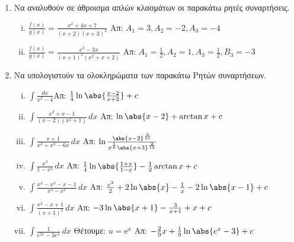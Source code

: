 





\begin{center}
  \minibox{\bfseries\large \textcolor{Col1}{Ολοκληρώματα Ρητών και Άρρητων Συναρτήσεων}}
\end{center}

\vspace{2\baselineskip}

\everymath{\displaystyle}

\pagestyle{empty}

\begin{enumerate}
  \item Να αναλυθούν σε άθροισμα απλών κλασμάτων οι παρακάτω ρητές συναρτήσεις.

    \begin{enumerate}[i)]
      \item $\frac{f(x)}{g(x)}=\frac{x^2+4x+7}{(x+2)(x+3)^2}$ 
        \hfill Απ: $A_1=3, A_2=-2, A_3=-4$
      \item $\frac{f(x)}{g(x)}=\frac{x^3-3x}{(x+1)^2(x^2+x+2)}$ 
        \hfill Απ: $A_1=\frac{1}{2}, A_2=1, A_3=\frac{1}{2}, B_3=-3$
    \end{enumerate}

  \item Να υπολογιστούν τα ολοκληρώματα των παρακάτω Ρητών συναρτήσεων.
    \begin{enumerate}[i)]
      \item $\int\frac{dx}{x^2-4}$\hfill Απ: $\frac{1}{4}\ln\abs{\frac{x-2}{x+2}}+c$
      \item $\int\frac{x^2+x-1}{(x-2)(x^2+1)}\,dx$ \hfill Απ: $\ln\abs{x-2}+\arctan x+c$
      \item $\int\frac{x+1}{x^3+x^2-6x}\,dx$ 
        \hfill Απ: $\ln\frac{\abs{x-2}^{\frac{3}{10}}}{x^{\frac{1}{6}}
        \abs{x+3}^{\frac{2}{15}}}$
      \item $\int\frac{x^2}{1-x^4}\,dx$ 
        \hfill Απ: $\frac{1}{4}\ln\abs{\frac{1+x}{1-x}}-\frac{1}{2}\arctan x+c$
      \item $\int\frac{x^4-x^3-x-1}{x^3-x^2}\,dx$ 
        \hfill Απ: $\frac{x^2}{2}+2\ln\abs{x}-\frac{1}{x}-2\ln\abs{x-1}+c$
      \item $\int \frac{x^2-x+1}{(x+1)^2}\,dx$
        \hfill Απ: $-3\ln\abs{x+1}-\frac{3}{x+1}+x+c$
      \item $\int\frac{1}{e^{2x}-3e^{x}}\,dx$ \quad \textcolor{Col1}{Θέτουμε:} $ u= 
        \mathrm{e}^{x} $ 
        \hfill Απ: $-\frac{2}{9}x+\frac{1}{9}\ln\abs{e^x-3}+c$
    \end{enumerate}


\end{enumerate}

